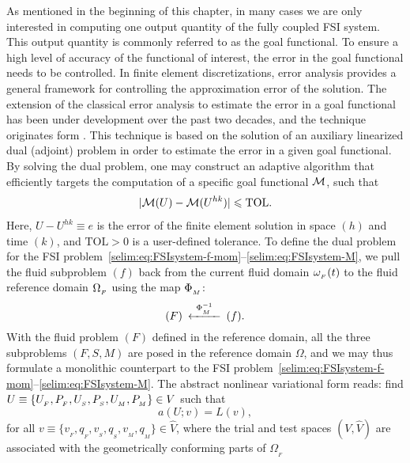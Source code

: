 As mentioned in the beginning of this chapter, in many cases we are
only interested in computing one output quantity of the fully coupled
FSI system. This output quantity is commonly referred to as the goal
functional.  To ensure a high level of accuracy of the functional of
interest, the error in the goal functional needs to be controlled. In
finite element discretizations, \apost{} error analysis
provides a general framework for controlling the approximation error
of the solution.  The extension of the classical \apost{}
error analysis to estimate the error in a goal functional has been
under development over the past two decades, and the technique
originates form \citet{ErikssonEstepEtAl1995,
BeckerRannacher2001}. This technique is based on the solution of an
auxiliary linearized dual (adjoint) problem in order to estimate the
error in a given goal functional. By solving the dual problem, one may
construct an adaptive algorithm that efficiently targets the
computation of a specific goal functional $\mathcal{M}$, such that
\begin{equation}
  \label{selim:eq:goalTOL}
|\mathcal{M}(U)-\mathcal{M}(U^{hk})| \leqslant \mathrm{TOL}.
\end{equation}
Here, $ U-U^{hk} \equiv e$ is the error of the finite element solution
in space $(h)$ and time $(k)$, and $\mathrm{TOL}>0$ is a user-defined
tolerance.  To define the dual problem for the FSI
problem~\eqref{selim:eq:FSIsystem-f-mom}--\eqref{selim:eq:FSIsystem-M}, we pull the fluid subproblem
$(f)$ back from the current fluid domain $\omega_{_{F}}(t)$ to the fluid reference
domain $\Omega_{_{F}}$ using the map $\Phi_{_{M}}$:
\begin{equation}
  \label{selim:eq:pullback}
  \begin{CD}
    (F) @<\PhiM^{-1}<< (f).
  \end{CD}
\end{equation}
With the fluid problem $(F)$ defined in the reference domain, all the
three subproblems $(F,S,M)$ are posed in the reference domain
$\Omega$, and we may thus formulate a monolithic counterpart to the
FSI problem~\eqref{selim:eq:FSIsystem-f-mom}--\eqref{selim:eq:FSIsystem-M}. The abstract nonlinear
variational form reads: find $U\equiv \{U_{_{F}}, P_{_{F}}, U_{_{S}}, P_{_{S}}, U_{_{M}},
P_{_{M}} \}\in V$ such that
\begin{equation}
\label{selim:eq:monolithic}
a(U;v) = L(v),
\end{equation}
for all $v\equiv\{ v_{_{F}}, q_{_{F}}, v_{_{S}}, q_{_{S}}, v_{_{M}}, q_{_{M}}
\}\in\hat{V}$, where the trial and test spaces $(V,\hat{V})$ are
associated with the geometrically conforming parts of $\Omega_{_{F}}$
